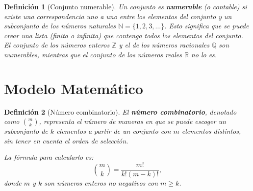 \documentclass[12pt,a4paper]{book}
\newtheorem{defi}{Definición}[section]
\begin{document}
\begin{defi}[Conjunto numerable]
\label{def:conjunto_numerable}
Un conjunto es \textbf{numerable} (o contable) si existe una correspondencia uno a uno entre los elementos del conjunto y un subconjunto de los números naturales $\mathbb{N} = \{1, 2, 3, \dots\}$. Esto significa que se puede crear una lista (finita o infinita) que contenga todos los elementos del conjunto. El conjunto de los números enteros $\mathbb{Z}$ y el de los números racionales $\mathbb{Q}$ son numerables, mientras que el conjunto de los números reales $\mathbb{R}$ no lo es.
\end{defi}

\section{Modelo Matemático}

\begin{defi}[Número combinatorio]
\label{def:combinatorio}
El \textbf{número combinatorio}, denotado como $\binom{m}{k}$, representa el número de maneras en que se puede escoger un subconjunto de $k$ elementos a partir de un conjunto con $m$ elementos distintos, sin tener en cuenta el orden de selección.

La fórmula para calcularlo es:
$$ \binom{m}{k} = \frac{m!}{k!(m-k)!},$$
donde $m$ y $k$ son números enteros no negativos con $m \ge k$.
\end{defi}




\nocite{*}


\end{document}
